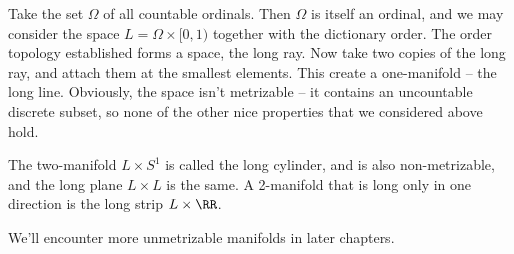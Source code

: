 \begin{example}
    Take the set $\Omega$ of all countable ordinals. Then $\Omega$ is itself an ordinal, and we may consider the space $L = \Omega \times [0,1)$ together with the dictionary order. The order topology established forms a space, the long ray. Now take two copies of the long ray, and attach them at the smallest elements. This create a one-manifold -- the long line. Obviously, the space isn't metrizable -- it contains an uncountable discrete subset, so none of the other nice properties that we considered above hold.
\end{example}

\begin{example}
    The two-manifold $L \times S^1$ is called the long cylinder, and is also non-metrizable, and the long plane $L \times L$ is the same. A 2-manifold that is long only in one direction is the long strip $L \times \RR$.
\end{example}

We'll encounter more unmetrizable manifolds in later chapters.





















